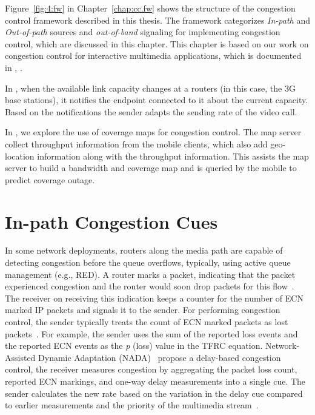 Figure~\ref{fig:4:fw} in Chapter~\ref{chap:cc.fw} shows the structure of the
congestion control framework described in this thesis. The framework
categorizes \emph{In-path} and \emph{Out-of-path} sources and
\emph{out-of-band} signaling for implementing congestion control, which are
discussed in this chapter. This chapter is based on our work on congestion
control for interactive multimedia applications, which is documented in
, .

In , when the available link capacity changes at a routers (in
this case, the 3G base stations), it notifies the endpoint connected to it
about the current capacity. Based on the notifications the sender adapts the
sending rate of the video call.

In , we explore the use of coverage maps for congestion
control. The map server collect throughput information from the mobile
clients, which also add geo-location information along with the throughput
information. This assists the map server to build a bandwidth and coverage map
and is queried by the mobile to predict coverage outage.

\section{In-path Congestion Cues}

In some network deployments, routers along the media path are capable of
detecting congestion before the queue overflows, typically, using active queue
management (e.g., RED). A router marks a packet, indicating that the packet
experienced congestion and the router would soon drop packets for this
flow~\cite{rfc3168}. The receiver on receiving this indication keeps a counter
for the number of ECN marked IP packets and signals it to the sender. For
performing congestion control, the sender typically treats the count of ECN
marked packets as lost packets~\cite{rfc6679}. For example, the sender uses
the sum of the reported loss events and the reported ECN events as the
\emph{p} (loss) value in the TFRC equation. Network-Assisted Dynamic
Adaptation (NADA)~\cite{rmcat-nada} propose a delay-based congestion control,
the receiver measures congestion by aggregating the packet loss count,
reported ECN markings, and one-way delay measurements into a single cue. The
sender calculates the new rate based on the variation in the delay cue
compared to earlier measurements and the priority of the multimedia
stream~\cite{pv-nada}.



